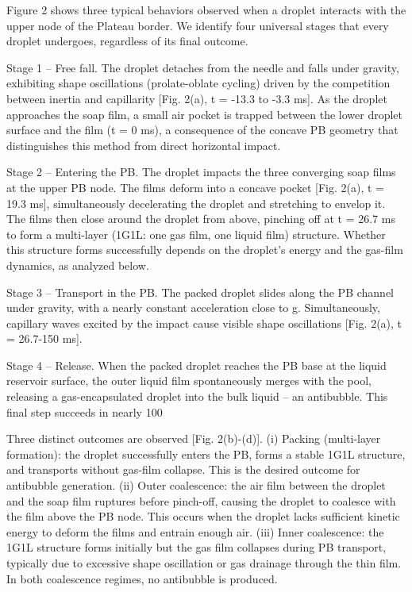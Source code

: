 Figure 2 shows three typical behaviors observed when a droplet interacts with the upper node of the Plateau border. We identify four universal stages that every droplet undergoes, regardless of its final outcome.

Stage 1 -- Free fall. The droplet detaches from the needle and falls under gravity, exhibiting shape oscillations (prolate-oblate cycling) driven by the competition between inertia and capillarity [Fig. 2(a), t = -13.3 to -3.3 ms]. As the droplet approaches the soap film, a small air pocket is trapped between the lower droplet surface and the film (t = 0 ms), a consequence of the concave PB geometry that distinguishes this method from direct horizontal impact.

Stage 2 -- Entering the PB. The droplet impacts the three converging soap films at the upper PB node. The films deform into a concave pocket [Fig. 2(a), t = 19.3 ms], simultaneously decelerating the droplet and stretching to envelop it. The films then close around the droplet from above, pinching off at t = 26.7 ms to form a multi-layer (1G1L: one gas film, one liquid film) structure. Whether this structure forms successfully depends on the droplet's energy and the gas-film dynamics, as analyzed below.

Stage 3 -- Transport in the PB. The packed droplet slides along the PB channel under gravity, with a nearly constant acceleration close to g. Simultaneously, capillary waves excited by the impact cause visible shape oscillations [Fig. 2(a), t = 26.7-150 ms].

Stage 4 -- Release. When the packed droplet reaches the PB base at the liquid reservoir surface, the outer liquid film spontaneously merges with the pool, releasing a gas-encapsulated droplet into the bulk liquid -- an antibubble. This final step succeeds in nearly 100%

Three distinct outcomes are observed [Fig. 2(b)-(d)]. (i) Packing (multi-layer formation): the droplet successfully enters the PB, forms a stable 1G1L structure, and transports without gas-film collapse. This is the desired outcome for antibubble generation. (ii) Outer coalescence: the air film between the droplet and the soap film ruptures before pinch-off, causing the droplet to coalesce with the film above the PB node. This occurs when the droplet lacks sufficient kinetic energy to deform the films and entrain enough air. (iii) Inner coalescence: the 1G1L structure forms initially but the gas film collapses during PB transport, typically due to excessive shape oscillation or gas drainage through the thin film. In both coalescence regimes, no antibubble is produced.

